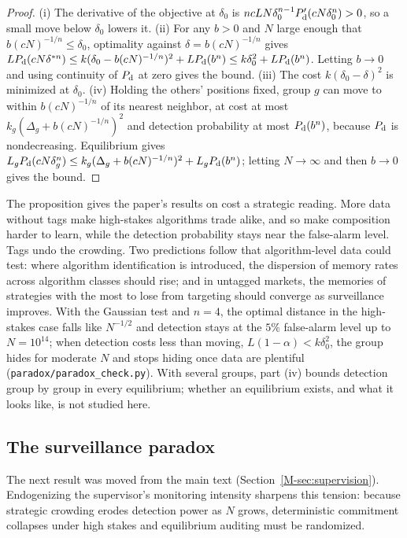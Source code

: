 \documentclass[12pt]{article}
\theoremstyle{definition}
\theoremstyle{remark}
\begin{document}
\begin{proof}
(i) The derivative of the objective at $\delta_0$ is $ncLN\delta_0^{n-1}P_{\rm d}'(cN\delta_0^n)>0$, so a small move below $\delta_0$ lowers it. (ii) For any $b>0$ and $N$ large enough that $b(cN)^{-1/n}\le\delta_0$, optimality against $\delta=b(cN)^{-1/n}$ gives $LP_{\rm d}(cN\delta^{*n})\le k(\delta_0-b(cN)^{-1/n})^2+LP_{\rm d}(b^n)\le k\delta_0^2+LP_{\rm d}(b^n)$. Letting $b\to0$ and using continuity of $P_{\rm d}$ at zero gives the bound. (iii) The cost $k(\delta_0-\delta)^2$ is minimized at $\delta_0$. (iv) Holding the others' positions fixed, group $g$ can move to within $b(cN)^{-1/n}$ of its nearest neighbor, at cost at most $k_g(\Delta_g+b(cN)^{-1/n})^2$ and detection probability at most $P_{\rm d}(b^n)$, because $P_{\rm d}$ is nondecreasing. Equilibrium gives $L_gP_{\rm d}(cN\delta_g^n)\le k_g(\Delta_g+b(cN)^{-1/n})^2+L_gP_{\rm d}(b^n)$; letting $N\to\infty$ and then $b\to0$ gives the bound.
\end{proof}

The proposition gives the paper's results on cost a strategic reading. More data without tags make high-stakes algorithms trade alike, and so make composition harder to learn, while the detection probability stays near the false-alarm level. Tags undo the crowding. Two predictions follow that algorithm-level data could test: where algorithm identification is introduced, the dispersion of memory rates across algorithm classes should rise; and in untagged markets, the memories of strategies with the most to lose from targeting should converge as surveillance improves. With the Gaussian test and $n=4$, the optimal distance in the high-stakes case falls like $N^{-1/2}$ and detection stays at the $5\%$ false-alarm level up to $N=10^{14}$; when detection costs less than moving, $L(1-\alpha)<k\delta_0^2$, the group hides for moderate $N$ and stops hiding once data are plentiful (\nolinkurl{paradox/paradox_check.py}). With several groups, part (iv) bounds detection group by group in every equilibrium; whether an equilibrium exists, and what it looks like, is not studied here.

\subsection{The surveillance paradox}\label{app:paradox}

\noindent The next result was moved from the main text (Section~\ref{M-sec:supervision}). Endogenizing the supervisor's monitoring intensity sharpens this tension: because strategic crowding erodes detection power as $N$ grows, deterministic commitment collapses under high stakes and equilibrium auditing must be randomized.
\end{document}
